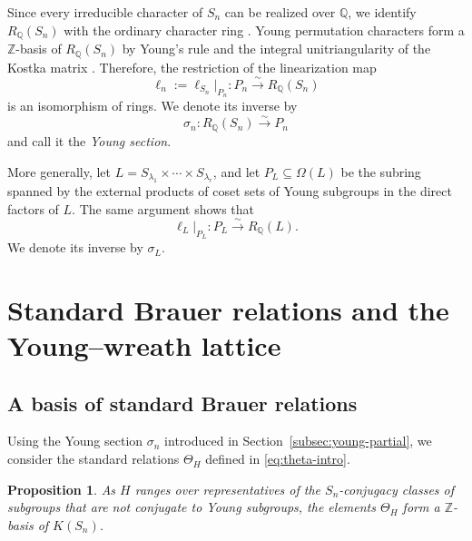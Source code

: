 \documentclass[a4paper,11pt]{article}
\numberwithin{equation}{section}
\newtheorem{proposition}[theorem]{Proposition}
\newcommand{\Q}{\mathbb{Q}}
\newcommand{\Z}{\mathbb{Z}}
\begin{document}
Since every irreducible character of $S_n$ can be realized over $\Q$, we identify
$R_{\Q}(S_n)$ with the ordinary character ring \cite{JamesKerber}. Young permutation
characters form a $\Z$-basis of $R_{\Q}(S_n)$ by Young's rule and the integral
unitriangularity of the Kostka matrix
\cite{JamesKerber,Macdonald,IdeiOda}. Therefore, the restriction of the linearization
map
\begin{equation}\label{eq:young-linearization}
  \ell_n:=\ell_{S_n}|_{P_n}:P_n\xrightarrow{\sim}R_{\Q}(S_n)
\end{equation}
is an isomorphism of rings. We denote its inverse by
\begin{equation}\label{eq:young-section}
  \sigma_n:R_{\Q}(S_n)\xrightarrow{\sim}P_n
\end{equation}
and call it the \emph{Young section}.

More generally, let
$L=S_{\lambda_1}\times\cdots\times S_{\lambda_r}$, and let
$P_L\subseteq\Omega(L)$ be the subring spanned by the external products of coset sets
of Young subgroups in the direct factors of $L$. The same argument shows that
\[
  \ell_L|_{P_L}:P_L\xrightarrow{\sim}R_{\Q}(L).
\]
We denote its inverse by $\sigma_L$.


\section{Standard Brauer relations and the Young--wreath lattice}\label{sec:standard-lattices}

\subsection{A basis of standard Brauer relations}

Using the Young section $\sigma_n$ introduced in Section~\ref{subsec:young-partial},
we consider the standard relations $\Theta_H$ defined in
\eqref{eq:theta-intro}.

\begin{proposition}\label{prop:standard-basis}
As $H$ ranges over representatives of the $S_n$-conjugacy classes of subgroups
that are not conjugate to Young subgroups, the elements $\Theta_H$ form a
$\Z$-basis of $K(S_n)$.
\end{proposition}
\end{document}
